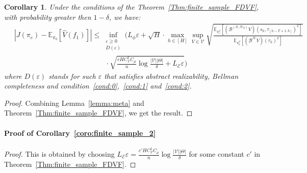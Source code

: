 \documentclass[twoside]{article}
\newtheorem{corollary}{Corollary}
\newcommand{\CAL}[1]{\mathcal{#1}}
\begin{document}
\begin{corollary}
Under the conditions of the Theorem~\ref{Thm:finite_sample_FDVF}, with probability greater then $1 - \delta$, we have:
\begin{align}
&\ |J(\pi_e)-\mathbb{E}_{\pi_b}[\hat{V}(f_1)]|\leq \inf_{\substack{\varepsilon\geq 0\\D(\varepsilon)}}\Bigg(L_\phi\varepsilon+\sqrt{H} \cdot \max_{h\in[H]}\sup_{V\in\CAL{V}}\sqrt{\frac{\mathbb{E}_{\pi_e^\phi}[(\CAL{B}^{(\CAL{S},\CAL{H}_T)}V)(s_h,\tau_{[h-T+1:h]})^2]}{\mathbb{E}_{\pi_b^\phi}[(\CAL{B^H}V)(\tau_h)^2]}}\nonumber\\&\qquad\qquad\quad\qquad\qquad\qquad\qquad\cdot\sqrt{\frac{cHC_{\CAL{V}}^2C_\mu}{n}\log\frac{|\CAL{V}||{\Theta}|}{\delta}+L_{\CAL{E}}\varepsilon} \Bigg)
\end{align}
where $D(\varepsilon)$ stands for such $\varepsilon$ that satisfies abstract realizability, Bellman completeness and condition~\ref{cond:0},~\ref{cond:1} and~\ref{cond:2}.
\end{corollary}
\begin{proof}
    Combining Lemma~\ref{lemma:meta} and Theorem~\ref{Thm:finite_sample_FDVF}, we get the result.
\end{proof}

\paragraph{Proof of Corollary~\ref{coro:finite_sample_2}}
\begin{proof}
    This is obtained by choosing $L_\CAL{E}\varepsilon=\frac{c'HC_{\CAL{V}}^2C_\mu}{n}\log\frac{|\CAL{V}||{\Theta}|}{\delta}$ for some constant $c'$ in Theorem~\ref{Thm:finite_sample_FDVF}.
\end{proof}
\end{document}
